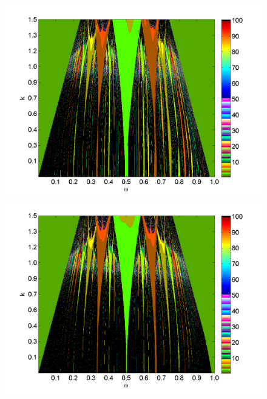 \begin{figure}[H]
\includegraphics[width=.5\textwidth]{figs/tongues_1000_L_05.png}\hfill
\includegraphics[width=.5\textwidth]{figs/tongues_1000_L_09.png}\\
\end{figure}
